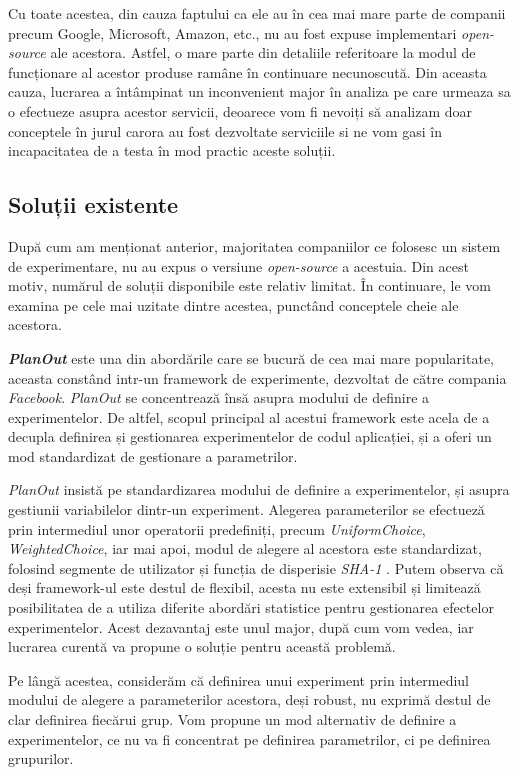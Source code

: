 Cu toate acestea, din cauza faptului ca ele au în cea mai mare parte de companii precum Google, Microsoft, Amazon, etc., nu au fost expuse implementari \textit{open-source} ale acestora. Astfel, o mare parte din detaliile referitoare la modul de funcționare al acestor produse ramâne în continuare necunoscută. Din aceasta cauza, lucrarea a întâmpinat un inconvenient major în analiza pe care urmeaza sa o efectueze asupra acestor servicii, deoarece vom fi nevoiți să analizam doar conceptele în jurul carora au fost dezvoltate serviciile si ne vom gasi în incapacitatea de a testa în mod practic aceste soluții.

\subsection{Soluții existente}

După cum am menționat anterior, majoritatea companiilor ce folosesc un sistem de experimentare, nu au expus o versiune \textit{open-source} a acestuia. Din acest motiv, numărul de soluții disponibile este relativ limitat. În continuare, le vom examina pe cele mai uzitate dintre acestea, punctând conceptele cheie ale acestora.

\textit{\textbf{PlanOut}} este una din abordările care se bucură de cea mai mare popularitate, aceasta constând intr-un framework de experimente, dezvoltat de către compania \textit{Facebook}. \textit{PlanOut} se concentrează însă asupra modului de definire a experimentelor. De altfel, scopul principal al acestui framework este acela de a decupla definirea și gestionarea experimentelor de codul aplicației, și a oferi un mod standardizat de gestionare a parametrilor. 

\textit{PlanOut} insistă pe standardizarea modului de definire a experimentelor, și asupra gestiunii variabilelor dintr-un experiment. Alegerea parameterilor se efectueză prin intermediul unor operatorii predefiniți, precum \textit{UniformChoice}, \textit{WeightedChoice}, iar mai apoi, modul de alegere al acestora este standardizat, folosind segmente de utilizator și funcția de disperisie \textit{SHA-1}  \cite{planout}. Putem observa că deși framework-ul este destul de flexibil, acesta nu este extensibil și limitează posibilitatea de a utiliza diferite abordări statistice pentru gestionarea efectelor experimentelor. Acest dezavantaj este unul major, după cum vom vedea, iar lucrarea curentă va propune o soluție pentru această problemă. 

Pe lângă acestea, considerăm că definirea unui experiment prin intermediul modului de alegere a parameterilor acestora, deși robust, nu exprimă destul de clar definirea fiecărui grup. Vom propune un mod alternativ de definire a experimentelor, ce nu va fi concentrat pe definirea parametrilor, ci pe definirea grupurilor. 

